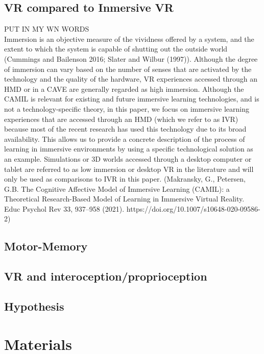 \documentclass{article}
\begin{document}
\subsection{ VR compared to Inmersive VR}
PUT IN MY WN WORDS \newline \\ 
 Immersion is an objective measure of the vividness offered by a system, and the extent to which the system is capable of shutting out the outside world (Cummings and Bailenson 2016; Slater and Wilbur (1997)). 
 Although the degree of immersion can vary based on the number of senses that are activated by the technology and the quality of the hardware, VR experiences accessed through an HMD or in a CAVE are generally regarded as high immersion. Although the CAMIL is relevant for existing and future immersive learning technologies, and is not a technology-specific theory, in this paper, we focus on immersive learning experiences that are accessed through an HMD (which we refer to as IVR) because most of the recent research has used this technology due to its broad availability. This allows us to provide a concrete description of the process of learning in immersive environments by using a specific technological solution as an example. Simulations or 3D worlds accessed through a desktop computer or tablet are referred to as low immersion or desktop VR in the literature and will only be used as comparisons to IVR in this paper.
(Makransky, G., Petersen, G.B. The Cognitive Affective Model of Immersive Learning (CAMIL): a Theoretical Research-Based Model of Learning in Immersive Virtual Reality. Educ Psychol Rev 33, 937–958 (2021). https://doi.org/10.1007/s10648-020-09586-2)
\subsection{Motor-Memory}


\subsection{VR and interoception/proprioception}


\subsection{Hypothesis}



\section{Materials}
\end{document}
